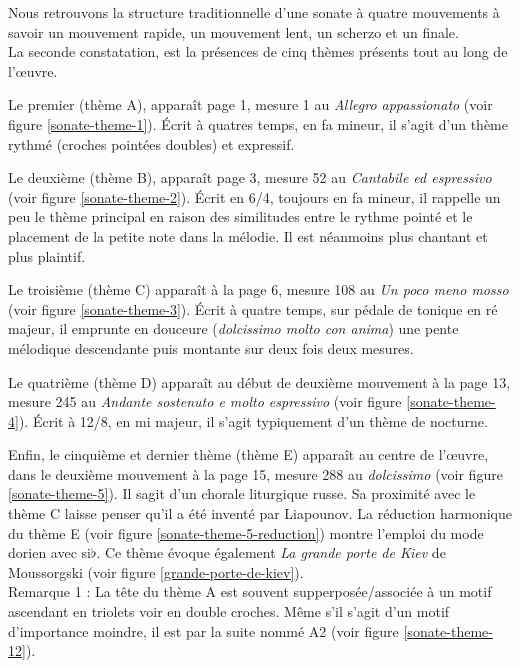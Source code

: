 Nous retrouvons la structure traditionnelle d'une sonate à quatre mouvements à savoir un mouvement rapide, un mouvement lent, un scherzo et un finale.\\

La seconde constatation, est la présences de cinq thèmes présents tout au long de l'œuvre.

Le premier (thème A), apparaît page 1, mesure 1 au \emph{Allegro appassionato} (voir figure \ref{sonate-theme-1}). Écrit à quatres temps, en fa mineur, il s'agit d'un thème rythmé (croches pointées doubles) et expressif.

Le deuxième (thème B), apparaît page 3, mesure 52 au \emph{Cantabile ed espressivo} (voir figure \ref{sonate-theme-2}). Écrit en 6/4, toujours en fa mineur, il rappelle un peu le thème principal en raison des similitudes entre le rythme pointé et le placement de la petite note dans la mélodie. Il est néanmoins plus chantant et plus plaintif.

Le troisième (thème C) apparaît à la page 6, mesure 108 au \emph{Un poco meno mosso} (voir figure \ref{sonate-theme-3}). Écrit à quatre temps, sur pédale de tonique en ré majeur, il emprunte en douceure (\emph{dolcissimo molto con anima}) une pente mélodique descendante puis montante sur deux fois deux mesures.

Le quatrième (thème D) apparaît au début de deuxième mouvement à la page 13, mesure 245 au \emph{Andante sostenuto e molto espressivo} (voir figure \ref{sonate-theme-4}). Écrit à 12/8, en mi majeur, il s'agit typiquement d'un thème de nocturne.

Enfin, le cinquième et dernier thème (thème E) apparaît au centre de l'œuvre, dans le deuxième mouvement à la page 15, mesure 288 au \emph{dolcissimo} (voir figure \ref{sonate-theme-5}). Il sagit d'un chorale liturgique russe. Sa proximité avec le thème C laisse penser qu'il a été inventé par Liapounov. La réduction harmonique du thème E (voir figure \ref{sonate-theme-5-reduction}) montre l'emploi du mode dorien avec si$\flat$. Ce thème évoque également \emph{La grande porte de Kiev} de Moussorgski (voir figure \ref{grande-porte-de-kiev}).\\

Remarque 1 : La tête du thème A est souvent supperposée/associée à un motif ascendant en triolets voir en double croches. Même s'il s'agit d'un motif d'importance moindre, il est par la suite nommé A2 (voir figure \ref{sonate-theme-12}).\\

